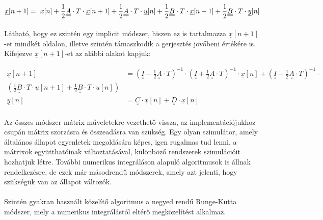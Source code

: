 \begin{equation}
\underline{x}[n + 1] = \ x[n] + \frac{1}{2}\underline{\underline{A}} \cdot T \cdot \underline{x}[n + 1] + \frac{1}{2}\underline{\underline{A}}\cdot{}T\cdot{}\underline{u}[n] + \frac{1}{2}\underline{\underline{B}} \cdot T \cdot \underline{x}[n + 1] + \frac{1}{2}\underline{\underline{B}}\cdot{}T\cdot{}\underline{y}[n] \\[0.3em]
\end{equation}

\paragraph{}
Látható, hogy ez szintén egy implicit módszer, hiszen ez is tartalmazza $\underline{x}[n+1]$-et mindkét oldalon, illetve szintén támaszkodik a gerjesztés jövőbeni értékére is. Kifejezve $\underline{x}[n+1]$-et az alábbi alakot kapjuk:

\begin{equation}
\begin{align*}
\underline{x}[n + 1] &= (\underline{\underline{I}} - \frac{1}{2}\underline{\underline{A}} \cdot T )^{-1} \cdot{} (\underline{\underline{I}} + \frac{1}{2}\underline{\underline{A}} \cdot T )^{-1} \cdot{} \underline{x}[n] + (\underline{\underline{I}} - \frac{1}{2}\underline{\underline{A}} \cdot T)^{-1} \cdot{} \\ (\frac{1}{2}\underline{\underline{B}} \cdot{} T \cdot{} \underline{u}[n+1] + \frac{1}{2}\underline{\underline{B}} \cdot{} T \cdot{} \underline{u}[n])  \\[0.3em]
\underline{y}[n] &= \underline{\underline{C}}\cdot \underline{x}[n] + \underline{\underline{D}}\cdot{}\underline{x}[n]
\end{align*} 
\end{equation}

\paragraph{}
Az összes módszer mátrix műveletekre vezethető vissza, az implementációjukhoz csupán mátrix szorzásra és összeadásra van szükség. Egy olyan szimulátor, amely általános állapot egyenletek megoldására képes, igen rugalmas tud lenni, a mátrixok együtthatóinak változtatásával, különböző rendszerek szimulációit hozhatjuk létre. További numerikus integráláson alapuló algoritmusok is állnak rendelkezésre, de ezek már másodrendű módszerek, amely azt jelenti, hogy szükségük van az állapot változók.
\paragraph{}
Szintén gyakran használt közelítő algoritmus a negyed rendű Runge-Kutta módszer, mely a numerikus integrálástól eltérő megközelítést alkalmaz.

